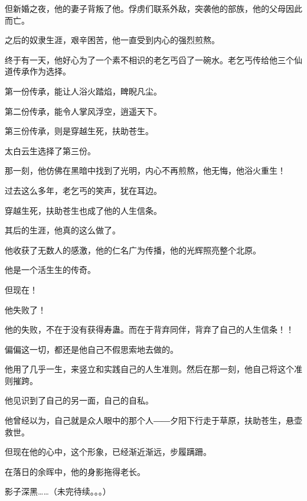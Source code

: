 \begin{this_body}
但新婚之夜，他的妻子背叛了他。俘虏们联系外敌，突袭他的部族，他的父母因此而亡。

之后的奴隶生涯，艰辛困苦，他一直受到内心的强烈煎熬。

终于有一天，他好心为了一个素不相识的老乞丐舀了一碗水。老乞丐传给他三个仙道传承作为选择。

第一份传承，能让人浴火踏焰，睥睨凡尘。

第二份传承，能令人掌风浮空，逍遥天下。

第三份传承，则是穿越生死，扶助苍生。

太白云生选择了第三份。

那一刻，他仿佛在黑暗中找到了光明，内心不再煎熬，他无悔，他浴火重生！

过去这么多年，老乞丐的笑声，犹在耳边。

穿越生死，扶助苍生也成了他的人生信条。

其后的生涯，他真的这么做了。

他收获了无数人的感激，他的仁名广为传播，他的光辉照亮整个北原。

他是一个活生生的传奇。

但现在！

他失败了！

他的失败，不在于没有获得寿蛊。而在于背弃同伴，背弃了自己的人生信条！！

偏偏这一切，都还是他自己不假思索地去做的。

他用了几乎一生，来竖立和实践自己的人生准则。然后在那一刻，他自己将这个准则摧跨。

他见识到了自己的另一面，自己的自私。

他曾经以为，自己就是众人眼中的那个人――夕阳下行走于草原，扶助苍生，悬壶救世。

但现在他的心中，这个形象，已经渐近渐远，步履蹒跚。

在落日的余晖中，他的身影拖得老长。

影子深黑……（未完待续。。。）

\end{this_body}

